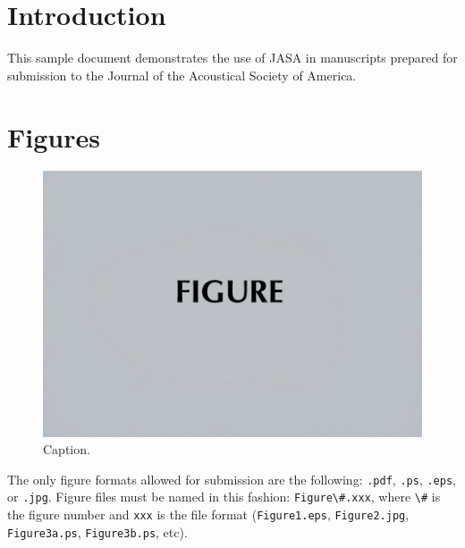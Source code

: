 \documentclass[preprint]{JASA}
\begin{document}
\maketitle




\hypertarget{introduction}{%
\section{Introduction}\label{introduction}}

This sample document demonstrates the use of JASA in manuscripts
prepared for submission to the Journal of the Acoustical Society of
America.

\hypertarget{figures}{%
\section{Figures}\label{figures}}

\begin{figure}
\includegraphics[width=\reprintcolumnwidth]{figsamp} \caption{Caption.}\label{fig:Figure1}
\end{figure}

The only figure formats allowed for submission are the following:
\texttt{.pdf}, \texttt{.ps}, \texttt{.eps}, or \texttt{.jpg}. Figure
files must be named in this fashion:
\texttt{Figure\textbackslash{}\#.xxx}, where \texttt{\textbackslash{}\#}
is the figure number and \texttt{xxx} is the file format
(\texttt{Figure1.eps}, \texttt{Figure2.jpg}, \texttt{Figure3a.ps},
\texttt{Figure3b.ps}, etc).
\end{document}
